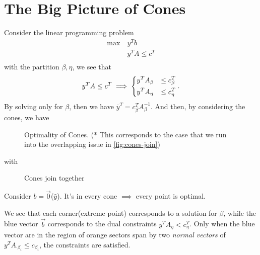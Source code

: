 \section{The Big Picture of Cones}
Consider the linear programming problem
\begin{align*}
	\max~ & y^{T} b            \\
	      & y^{T} A \leq c^{T} \\
\end{align*}
with the partition \(\beta, \eta\), we see that
\[
	y^{T} A \leq c^{T} \implies \begin{dcases}
		y^{T} A_{\beta} & \leq c^{T}_{\beta} \\
		y^{T} A_{\eta}  & \leq c^{T}_{\eta}
	\end{dcases}.
\]
By solving only for \(\beta\), then we have \(\overline{y}^{T} = c_{\beta}^{T} A^{-1}_{\beta}\). And then, by considering the cones, we have

\begin{figure}[H]
	\centering
	\caption{Optimality of Cones. (* This corresponds to the case that we run into the overlapping issue in \autoref{fig:cones-join})}
	\label{fig:opt-cones}
\end{figure}
with
\begin{figure}[H]
	\centering
	\caption{Cones join together}
	\label{fig:cones-join}
\end{figure}

\begin{note}
	Consider \(b = \vec{0}\)(\(\hat{y}\)). It's in every cone \(\implies\) every point is optimal.
\end{note}

\begin{remark}
	We see that each corner(extreme point) corresponds to a solution for \(\beta\), while the blue vector \(\vec{b}\) corresponds to the dual constraints
	\(y^{T} A_{\eta}<c_{\eta}^{T}\). Only when the blue vector are in the region of orange sectors span by two \emph{normal vectors} of
	\(y^{T}A_{\cdot \beta_i}\leq c_{\beta_i}\), the constraints are satisfied.
\end{remark}

